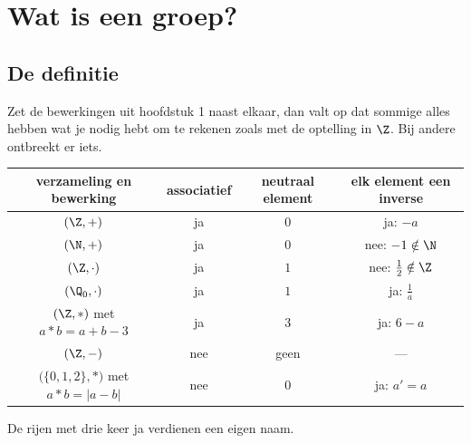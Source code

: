 \section{Wat is een groep?}

\subsection{De definitie}

Zet de bewerkingen uit hoofdstuk 1 naast elkaar, dan valt op dat sommige alles hebben wat je nodig hebt om te rekenen zoals met de optelling in $\Z$. Bij andere ontbreekt er iets.

\begin{center}
\renewcommand{\arraystretch}{1.3}
\begin{tabular}{|c|c|c|c|}
\hline
\rowcolor{accent!14} verzameling en bewerking & associatief & neutraal element & elk element een inverse \\ \hline
$(\Z, +)$ & ja & $0$ & ja: $-a$ \\ \hline
$(\N, +)$ & ja & $0$ & nee: $-1 \notin \N$ \\ \hline
$(\Z, \cdot)$ & ja & $1$ & nee: $\tfrac12 \notin \Z$ \\ \hline
$(\Q_0, \cdot)$ & ja & $1$ & ja: $\tfrac1a$ \\ \hline
$(\Z, \ast)$ met $a \ast b = a + b - 3$ & ja & $3$ & ja: $6 - a$ \\ \hline
$(\Z, -)$ & nee & geen & --- \\ \hline
$\bigl(\{0, 1, 2\}, \ast\bigr)$ met $a \ast b = |a - b|$ & nee & $0$ & ja: $a' = a$ \\ \hline
\end{tabular}
\end{center}

De rijen met drie keer ja verdienen een eigen naam.

